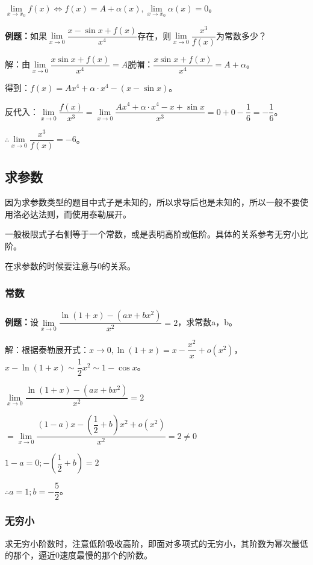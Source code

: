 \documentclass[UTF8, 12pt]{ctexart}
\begin{document}
$\lim\limits_{x\to x_0}f(x)\Leftrightarrow f(x)=A+\alpha(x),\lim\limits_{x\to x_0}\alpha(x)=0$。

\textbf{例题：}如果$\lim\limits_{x\to 0}\dfrac{x-\sin x+f(x)}{x^4}$存在，则$\lim\limits_{x\to 0}\dfrac{x^3}{f(x)}$为常数多少？

解：由$\lim\limits_{x\to 0}\dfrac{x\sin x+f(x)}{x^4}=A$脱帽：$\dfrac{x\sin x+f(x)}{x^4}=A+\alpha$。

得到：$f(x)=Ax^4+\alpha\cdot x^4-(x-\sin x)$。

反代入：$\lim\limits_{x\to 0}\dfrac{f(x)}{x^3}=\lim\limits_{x\to 0}\dfrac{Ax^4+\alpha\cdot x^4-x+\sin x}{x^3}=0+0-\dfrac{1}{6}=-\dfrac{1}{6}$。

$\therefore \lim\limits_{x\to 0}\dfrac{x^3}{f(x)}=-6$。

\subsection{求参数}

因为求参数类型的题目中式子是未知的，所以求导后也是未知的，所以一般不要使用洛必达法则，而使用泰勒展开。

一般极限式子右侧等于一个常数，或是表明高阶或低阶。具体的关系参考无穷小比阶。

在求参数的时候要注意与0的关系。

\subsubsection{常数}

\textbf{例题：}设$\lim\limits_{x\to 0}\dfrac{\ln(1+x)-(ax+bx^2)}{x^2}=2$，求常数a，b。

解：根据泰勒展开式：$x\to 0,\ln(1+x)=x-\dfrac{x^2}{x}+o(x^2)$，$x-\ln(1+x)\sim\dfrac{1}{2}x^2\sim 1-\cos x$。

$\lim\limits_{x\to 0}\dfrac{\ln(1+x)-(ax+bx^2)}{x^2}=2$

$=\lim\limits_{x\to 0}\dfrac{(1-a)x-\left(\dfrac{1}{2}+b\right)x^2+o(x^2)}{x^2}=2\neq 0$

$1-a=0;-\left(\dfrac{1}{2}+b\right)=2$\medskip

$\therefore a=1;b=-\dfrac{5}{2}$。

\subsubsection{无穷小}

求无穷小阶数时，注意低阶吸收高阶，即面对多项式的无穷小，其阶数为幂次最低的那个，逼近0速度最慢的那个的阶数。
\end{document}

